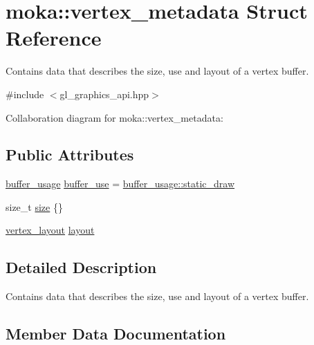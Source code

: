 \hypertarget{structmoka_1_1vertex__metadata}{}\section{moka\+::vertex\+\_\+metadata Struct Reference}
\label{structmoka_1_1vertex__metadata}


Contains data that describes the size, use and layout of a vertex buffer.  




{\ttfamily \#include $<$gl\+\_\+graphics\+\_\+api.\+hpp$>$}



Collaboration diagram for moka\+::vertex\+\_\+metadata\+:
\subsection*{Public Attributes}
\begin{DoxyCompactItemize}
\item 
\mbox{\hyperlink{namespacemoka_a4799e695da8b173f75809387af8abed7}{buffer\+\_\+usage}} \mbox{\hyperlink{structmoka_1_1vertex__metadata_ae235c8ab564e2b0ac4bf459c5c6388a9}{buffer\+\_\+use}} = \mbox{\hyperlink{namespacemoka_a4799e695da8b173f75809387af8abed7a189a433f29705bbe60128483495ddfd9}{buffer\+\_\+usage\+::static\+\_\+draw}}
\item 
size\+\_\+t \mbox{\hyperlink{structmoka_1_1vertex__metadata_a87f180c1e0e1164eb3854e0444570212}{size}} \{\}
\item 
\mbox{\hyperlink{classmoka_1_1vertex__layout}{vertex\+\_\+layout}} \mbox{\hyperlink{structmoka_1_1vertex__metadata_a8c1902f88285695ee1f03423f6c7b418}{layout}}
\end{DoxyCompactItemize}


\subsection{Detailed Description}
Contains data that describes the size, use and layout of a vertex buffer. 

\subsection{Member Data Documentation}
\mbox{\label{structmoka_1_1vertex__metadata_ae235c8ab564e2b0ac4bf459c5c6388a9}} 
